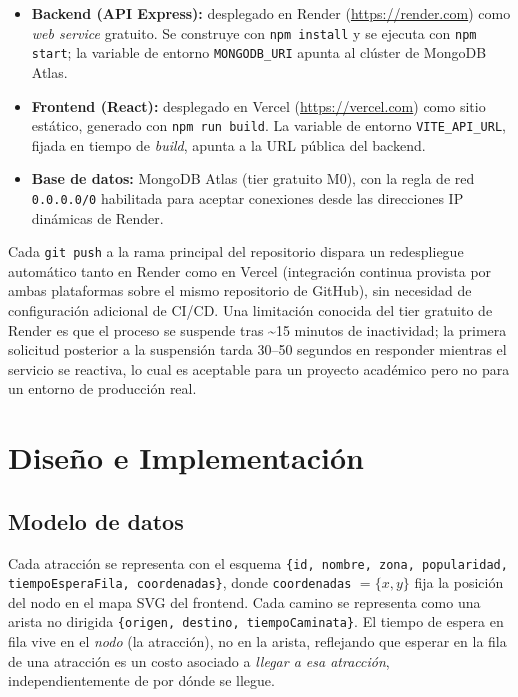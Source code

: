 \documentclass[conference]{IEEEtran}
\begin{document}
\begin{itemize}
  \item \textbf{Backend (API Express):} desplegado en Render
    (\url{https://render.com}) como \emph{web service} gratuito. Se construye
    con \texttt{npm install} y se ejecuta con \texttt{npm start}; la variable
    de entorno \texttt{MONGODB\_URI} apunta al cl\'uster de MongoDB Atlas.
  \item \textbf{Frontend (React):} desplegado en Vercel
    (\url{https://vercel.com}) como sitio est\'atico, generado con
    \texttt{npm run build}. La variable de entorno \texttt{VITE\_API\_URL},
    fijada en tiempo de \emph{build}, apunta a la URL p\'ublica del backend.
  \item \textbf{Base de datos:} MongoDB Atlas (tier gratuito M0), con la regla
    de red \texttt{0.0.0.0/0} habilitada para aceptar conexiones desde las
    direcciones IP din\'amicas de Render.
\end{itemize}

Cada \texttt{git push} a la rama principal del repositorio dispara un
redespliegue autom\'atico tanto en Render como en Vercel (integraci\'on
continua provista por ambas plataformas sobre el mismo repositorio de
GitHub), sin necesidad de configuraci\'on adicional de CI/CD. Una limitaci\'on
conocida del tier gratuito de Render es que el proceso se suspende tras
\textasciitilde15 minutos de inactividad; la primera solicitud posterior a la
suspensi\'on tarda 30--50 segundos en responder mientras el servicio se
reactiva, lo cual es aceptable para un proyecto acad\'emico pero no para un
entorno de producci\'on real.

\section{Dise\~no e Implementaci\'on}

\subsection{Modelo de datos}

Cada atracci\'on se representa con el esquema
\texttt{\{id, nombre, zona, popularidad, tiempoEsperaFila, coordenadas\}},
donde \texttt{coordenadas} $=\{x,y\}$ fija la posici\'on del nodo en el mapa
SVG del frontend. Cada camino se representa como una arista no dirigida
\texttt{\{origen, destino, tiempoCaminata\}}. El tiempo de espera en fila
vive en el \emph{nodo} (la atracci\'on), no en la arista, reflejando que
esperar en la fila de una atracci\'on es un costo asociado a \emph{llegar a
esa atracci\'on}, independientemente de por d\'onde se llegue.
\end{document}
